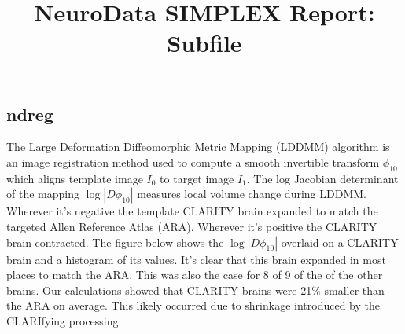 \documentclass[simplex.tex]{subfiles}
\title{NeuroData SIMPLEX Report: Subfile}
\begin{document}


\subsection{ndreg}

The Large Deformation Diffeomorphic Metric Mapping (LDDMM) algorithm is
an image registration method used to compute a smooth invertible
transform $\phi_{10}$ which aligns template image $I_0$ to target
image $I_1$. The log Jacobian determinant of the mapping $\log
|D\phi_{10}|$ measures local volume change during LDDMM.  Wherever it’s
negative the template CLARITY brain expanded to match the targeted Allen
Reference Atlas (ARA).  Wherever it’s positive the CLARITY brain
contracted.  The figure below shows the $\log |D\phi_{10}|$ overlaid
on a CLARITY brain and a histogram of its values.  It’s clear that this
brain expanded in most places to match the ARA.  This was also the case
for 8 of 9 of the of the other brains.  Our calculations showed that
CLARITY brains were 21\% smaller than the ARA on average.  This likely
occurred due to shrinkage introduced by the CLARIfying processing.
\end{document}

